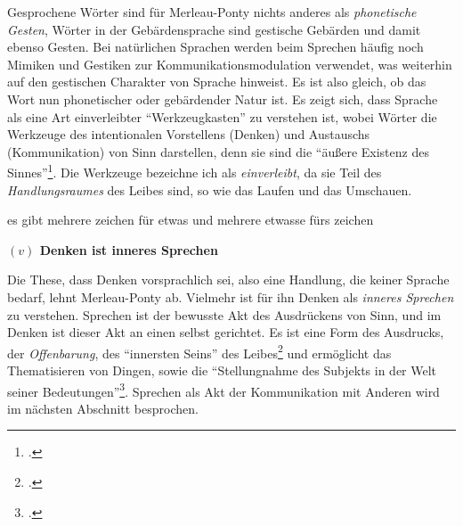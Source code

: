 \documentclass[a4paper, 12pt]{article}
\begin{document}
\begin{onehalfspace}
Gesprochene Wörter sind für Merleau-Ponty nichts anderes als \emph{phonetische Gesten}, Wörter in der Gebärdensprache sind gestische Gebärden und damit ebenso Gesten. Bei natürlichen Sprachen werden beim Sprechen häufig noch Mimiken und Gestiken zur Kommunikationsmodulation verwendet, was weiterhin auf den gestischen Charakter von Sprache hinweist. Es ist also gleich, ob das Wort nun  phonetischer oder gebärdender Natur ist. Es zeigt sich, dass Sprache als eine Art einverleibter "`Werkzeugkasten"' zu verstehen ist, wobei Wörter die Werkzeuge des intentionalen Vorstellens (Denken) und Austauschs (Kommunikation) von Sinn darstellen, denn sie sind die "`äußere Existenz des Sinnes"'\footnote{\Cite[Siehe][S. 216]{merleau1966phanomenologie}.}. Die Werkzeuge bezeichne ich als \emph{einverleibt}, da sie Teil des \emph{Handlungsraumes} des Leibes sind, so wie das Laufen und das Umschauen.

es gibt mehrere zeichen für etwas und mehrere etwasse fürs zeichen

\vspace{5mm}

\noindent\textbf{$(v)$ Denken ist inneres Sprechen}

\noindent Die These, dass Denken vorsprachlich sei, also eine Handlung, die keiner Sprache bedarf, lehnt Merleau-Ponty ab. Vielmehr ist für ihn Denken als \emph{inneres Sprechen} zu verstehen. Sprechen ist der bewusste Akt des Ausdrückens von Sinn, und im Denken ist dieser Akt an einen selbst gerichtet. Es ist eine Form des Ausdrucks, der \emph{Offenbarung}, des "`innersten Seins"' des Leibes\footnote{\Cite[Vgl.][S. 232]{merleau1966phanomenologie}.} und ermöglicht das Thematisieren von Dingen, sowie die "`Stellungnahme des Subjekts in der Welt seiner Bedeutungen"'\footnote{\Cite[Siehe][S. 229]{merleau1966phanomenologie}.}. Sprechen als Akt der Kommunikation mit Anderen wird im nächsten Abschnitt besprochen. 


\end{onehalfspace}
\end{document}
